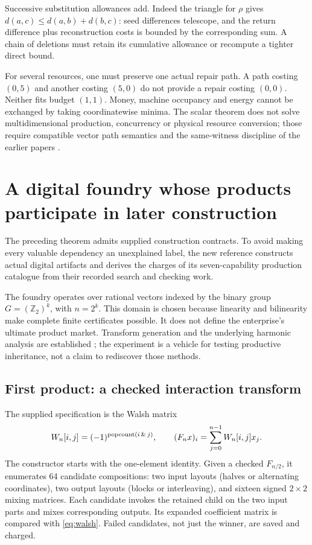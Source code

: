 \documentclass[11pt,letterpaper]{article}
\theoremstyle{definition}\newtheorem{definition}[theorem]{Definition}
\theoremstyle{remark}\newtheorem{remark}[theorem]{Remark}
\begin{document}
Successive substitution allowances add. Indeed the triangle for $\rho$ gives $d(a,c)\le d(a,b)+d(b,c)$: seed differences telescope, and the return difference plus reconstruction costs is bounded by the corresponding sum. A chain of deletions must retain its cumulative allowance or recompute a tighter direct bound.

For several resources, one must preserve one actual repair path. A path costing $(0,5)$ and another costing $(5,0)$ do not provide a repair costing $(0,0)$. Neither fits budget $(1,1)$. Money, machine occupancy and energy cannot be exchanged by taking coordinatewise minima. The scalar theorem does not solve multidimensional production, concurrency or physical resource conversion; those require compatible vector path semantics and the same-witness discipline of the earlier papers \cite{strategise,previous}.

\section{A digital foundry whose products participate in later construction}
\label{sec:foundry}
The preceding theorem admits supplied construction contracts. To avoid making every valuable dependency an unexplained label, the new reference constructs actual digital artifacts and derives the charges of its seven-capability production catalogue from their recorded search and checking work.

The foundry operates over rational vectors indexed by the binary group $G=(\mathbb Z_2)^k$, with $n=2^k$. This domain is chosen because linearity and bilinearity make complete finite certificates possible. It does not define the enterprise's ultimate product market. Transform generation and the underlying harmonic analysis are established \cite{spiral,odonnell}; the experiment is a vehicle for testing productive inheritance, not a claim to rediscover those methods.

\subsection{First product: a checked interaction transform}
The supplied specification is the Walsh matrix
\begin{equation}
 W_n[i,j]=(-1)^{\operatorname{popcount}(i\,\&\,j)},\qquad (F_nx)_i=\sum_{j=0}^{n-1}W_n[i,j]x_j.
 \label{eq:walsh}
\end{equation}
The constructor starts with the one-element identity. Given a checked $F_{n/2}$, it enumerates 64 candidate compositions: two input layouts (halves or alternating coordinates), two output layouts (blocks or interleaving), and sixteen signed $2\times2$ mixing matrices. Each candidate invokes the retained child on the two input parts and mixes corresponding outputs. Its expanded coefficient matrix is compared with \eqref{eq:walsh}. Failed candidates, not just the winner, are saved and charged.
\end{document}

